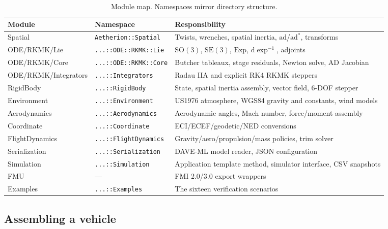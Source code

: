 \documentclass[a4paper,10pt]{article}
\newcommand{\SO}{\mathrm{SO}(3)}
\newcommand{\SE}{\mathrm{SE}(3)}
\newcommand{\Exp}{\mathrm{Exp}}
\newcommand{\dexp}{\mathrm{d}\exp}
\newcommand{\ad}{\mathrm{ad}}
\newcommand{\code}[1]{\texttt{\small #1}}
\theoremstyle{definition}
\begin{document}
\begin{table}[h]
  \centering
  \caption{Module map.  Namespaces mirror directory structure.}
  \label{tab:modules}
  \small
  \begin{tabular}{lll}
    \toprule
    Module & Namespace & Responsibility \\
    \midrule
    Spatial        & \code{Aetherion::Spatial}      & Twists, wrenches, spatial inertia, $\ad$/$\ad^*$, transforms \\
    ODE/RKMK/Lie   & \code{...::ODE::RKMK::Lie}     & $\SO$, $\SE$, $\Exp$, $\dexp^{-1}$, adjoints \\
    ODE/RKMK/Core  & \code{...::ODE::RKMK::Core}    & Butcher tableaux, stage residuals, Newton solve, AD Jacobian \\
    ODE/RKMK/Integrators & \code{...::Integrators}  & Radau IIA and explicit RK4 RKMK steppers \\
    RigidBody      & \code{...::RigidBody}          & State, spatial inertia assembly, vector field, 6-DOF stepper \\
    Environment    & \code{...::Environment}        & US1976 atmosphere, WGS84 gravity and constants, wind models \\
    Aerodynamics   & \code{...::Aerodynamics}       & Aerodynamic angles, Mach number, force/moment assembly \\
    Coordinate     & \code{...::Coordinate}         & ECI/ECEF/geodetic/NED conversions \\
    FlightDynamics & \code{...::FlightDynamics}     & Gravity/aero/propulsion/mass policies, trim solver \\
    Serialization  & \code{...::Serialization}      & DAVE-ML model reader, JSON configuration \\
    Simulation     & \code{...::Simulation}         & Application template method, simulator interface, CSV snapshots \\
    FMU            & ---                            & FMI 2.0/3.0 export wrappers \\
    Examples       & \code{...::Examples}           & The sixteen verification scenarios \\
    \bottomrule
  \end{tabular}
\end{table}

\subsection{Assembling a vehicle}
\end{document}
